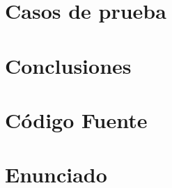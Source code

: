\documentclass[a4paper,10pt]{article}
\begin{document}
\section{Casos de prueba}

\newpage
\section{Conclusiones}

\appendix
\newpage
\section{C\'odigo Fuente}
%    
%    
%    

\newpage
\section{Enunciado}
%
\end{document}
